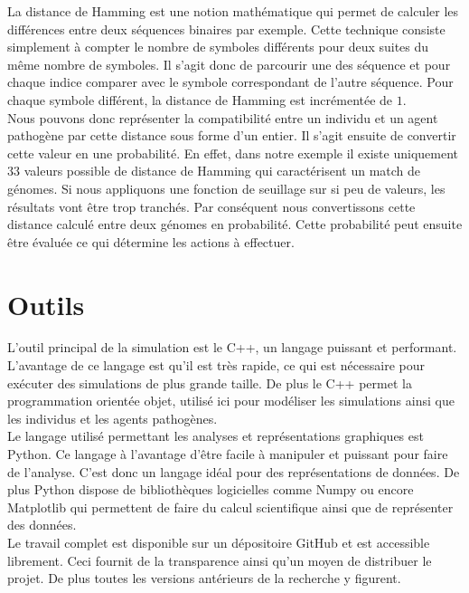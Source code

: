 La distance de Hamming est une notion mathématique qui permet de calculer les différences entre deux séquences binaires par exemple. Cette technique consiste simplement à compter le nombre de symboles différents pour deux suites du même nombre de symboles. Il s'agit donc de parcourir une des séquence et pour chaque indice comparer avec le symbole correspondant de l'autre séquence. Pour chaque symbole différent, la distance de Hamming est incrémentée de $1$.\\

Nous pouvons donc représenter la compatibilité entre un individu et un agent pathogène par cette distance sous forme d'un entier. Il s'agit ensuite de convertir cette valeur en une probabilité. En effet, dans notre exemple il existe uniquement $33$ valeurs possible de distance de Hamming qui caractérisent un match de génomes. Si nous appliquons une fonction de seuillage sur si peu de valeurs, les résultats vont être trop tranchés. Par conséquent nous convertissons cette distance calculé entre deux génomes en probabilité. Cette probabilité peut ensuite être évaluée ce qui détermine les actions à effectuer.\\

\section{Outils}
L'outil principal de la simulation est le C++, un langage puissant et performant. L'avantage de ce langage est qu'il est très rapide, ce qui est nécessaire pour exécuter des simulations de plus grande taille. De plus le C++ permet la programmation orientée objet, utilisé ici pour modéliser les simulations ainsi que les individus et les agents pathogènes.\\

Le langage utilisé permettant les analyses et représentations graphiques est Python. Ce langage à l'avantage d'être facile à manipuler et puissant pour faire de l'analyse. C'est donc un langage idéal pour des représentations de données. De plus Python dispose de bibliothèques logicielles comme Numpy ou encore Matplotlib qui permettent de faire du calcul scientifique ainsi que de représenter des données.\\

Le travail complet est disponible sur un dépositoire GitHub et est accessible librement. Ceci fournit de la transparence ainsi qu'un moyen de distribuer le projet. De plus toutes les versions antérieurs de la recherche y figurent.
